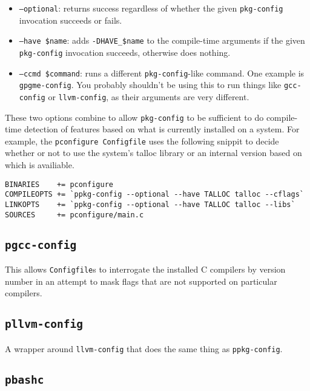 \documentclass{article}
\newcommand{\pconfigure}{\texttt{pconfigure}}
\begin{document}
\begin{itemize}
\item \texttt{--optional}: returns success regardless of whether the
  given \texttt{pkg-config} invocation succeeds or fails.
\item \texttt{--have \$name}: adds \texttt{-DHAVE\_\$name} to the
  compile-time arguments if the given \texttt{pkg-config} invocation
  succeeds, otherwise does nothing.
\item \texttt{--ccmd \$command}: runs a different
  \texttt{pkg-config}-like command.  One example is
  \texttt{gpgme-config}.  You probably shouldn't be using this to run
  things like \texttt{gcc-config} or \texttt{llvm-config}, as their
  arguments are very different.
\end{itemize}

These two options combine to allow \texttt{pkg-config} to be
sufficient to do compile-time detection of features based on what is
currently installed on a system.  For example, the
\pconfigure\ \texttt{Configfile} uses the following snippit to decide
whether or not to use the system's talloc library or an internal
version based on which is availiable.

\begin{verbatim}
BINARIES    += pconfigure
COMPILEOPTS += `ppkg-config --optional --have TALLOC talloc --cflags`
LINKOPTS    += `ppkg-config --optional --have TALLOC talloc --libs`
SOURCES     += pconfigure/main.c
\end{verbatim}

\subsection{\texttt{pgcc-config} \label{prog:pgcc-config}}

This allows \texttt{Configfile}s to interrogate the installed C
compilers by version number in an attempt to mask flags that are not
supported on particular compilers.

\subsection{\texttt{pllvm-config} \label{prog:pllvm-config}}

A wrapper around \texttt{llvm-config} that does the same thing as
\texttt{ppkg-config}.

\subsection{\texttt{pbashc} \label{prog:pbashc}}
\end{document}
